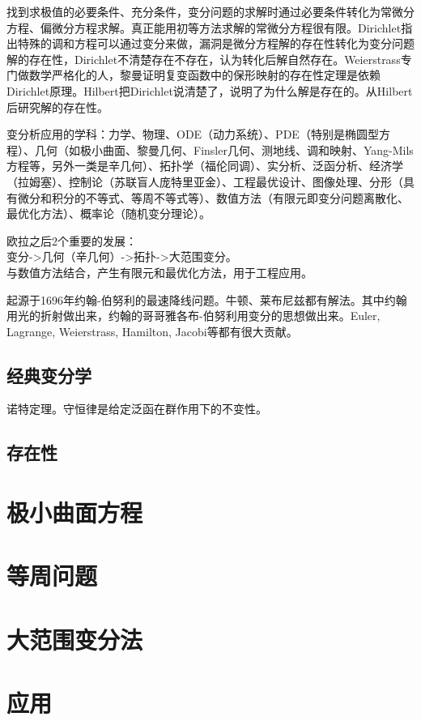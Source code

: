 \documentclass[UTF8]{../09-Mathematics}
\begin{document}
找到求极值的必要条件、充分条件，变分问题的求解时通过必要条件转化为常微分方程、偏微分方程求解。真正能用初等方法求解的常微分方程很有限。Dirichlet指出特殊的调和方程可以通过变分来做，漏洞是微分方程解的存在性转化为变分问题解的存在性，Dirichlet不清楚存在不存在，认为转化后解自然存在。Weierstrass专门做数学严格化的人，黎曼证明复变函数中的保形映射的存在性定理是依赖Dirichlet原理。Hilbert把Dirichlet说清楚了，说明了为什么解是存在的。从Hilbert后研究解的存在性。

变分析应用的学科：力学、物理、ODE（动力系统）、PDE（特别是椭圆型方程）、几何（如极小曲面、黎曼几何、Finsler几何、测地线、调和映射、Yang-Mils方程等，另外一类是辛几何）、拓扑学（福伦同调）、实分析、泛函分析、经济学（拉姆塞）、控制论（苏联盲人庞特里亚金）、工程最优设计、图像处理、分形（具有微分和积分的不等式、等周不等式等）、数值方法（有限元即变分问题离散化、最优化方法）、概率论（随机变分理论）。

欧拉之后2个重要的发展：\\
变分->几何（辛几何）->拓扑->大范围变分。\\
与数值方法结合，产生有限元和最优化方法，用于工程应用。


起源于1696年约翰-伯努利的最速降线问题。牛顿、莱布尼兹都有解法。其中约翰用光的折射做出来，约翰的哥哥雅各布-伯努利用变分的思想做出来。Euler, Lagrange, Weierstrass, Hamilton, Jacobi等都有很大贡献。

\subsection{经典变分学}

诺特定理。守恒律是给定泛函在群作用下的不变性。


\subsection{存在性}



\section{极小曲面方程}
\section{等周问题}
\section{大范围变分法}


\section{应用}
\end{document}

